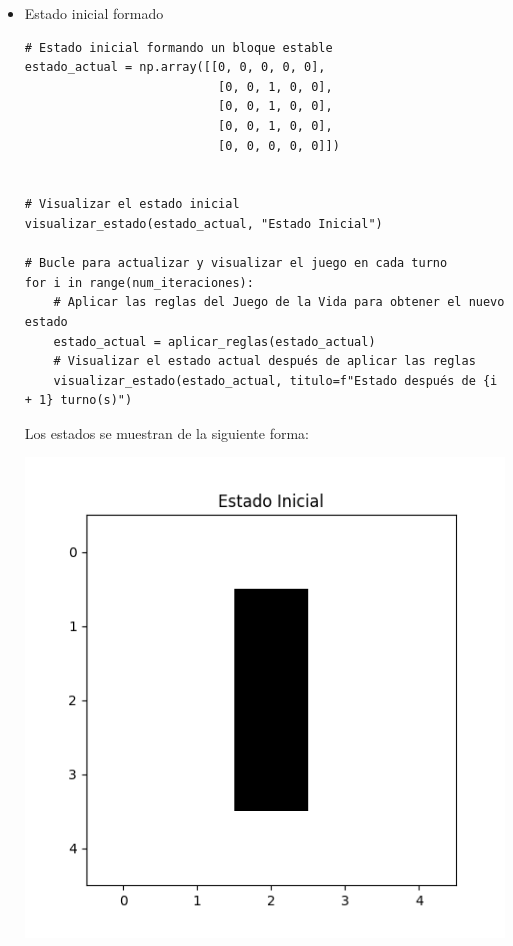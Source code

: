 \begin{enumerate}
\begin{itemize}
    \item Estado inicial formado\\

\begin{lstlisting}
# Estado inicial formando un bloque estable
estado_actual = np.array([[0, 0, 0, 0, 0],
                           [0, 0, 1, 0, 0],
                           [0, 0, 1, 0, 0],
                           [0, 0, 1, 0, 0],
                           [0, 0, 0, 0, 0]]) 


# Visualizar el estado inicial
visualizar_estado(estado_actual, "Estado Inicial")

# Bucle para actualizar y visualizar el juego en cada turno
for i in range(num_iteraciones):
    # Aplicar las reglas del Juego de la Vida para obtener el nuevo estado
    estado_actual = aplicar_reglas(estado_actual)
    # Visualizar el estado actual después de aplicar las reglas
    visualizar_estado(estado_actual, titulo=f"Estado después de {i + 1} turno(s)")
\end{lstlisting}
    Los estados se muestran de la siguiente forma:
\begin{center}
    \includegraphics[scale=0.4]{Practica05/IMA/ejemplosJuegoVida/ejemplo 2.1.png}

\end{center}
\end{itemize}
\end{enumerate}
